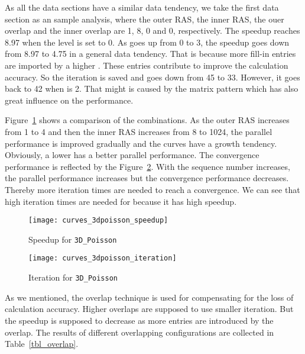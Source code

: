 \documentclass[runningheads,a4paper]{llncs}
\begin{document}
{As all the data sections have a similar data tendency, we take the first data section as an sample analysis, where the outer RAS, the inner RAS, the ouer overlap and the inner overlap are 1, 8, 0 and 0, respectively. The speedup reaches 8.97 when the  level is set to 0. As  goes up from 0 to 3, the speedup goes down from 8.97 to 4.75 in a general data tendency. That is because more fill-in entries are imported by a higher . These entries contribute to improve the calculation accuracy. So the iteration is saved and goes down from 45 to 33. However, it goes back to 42 when  is 2. That might is caused by the matrix pattern which has also great influence on the performance.

Figure~\ref{fig_3dpoisson_speedup} shows a comparison of the combinations. As the outer RAS increases from 1 to 4 and then the inner RAS increases from 8 to 1024, the parallel performance is improved gradually and the curves have a growth tendency. Obviously, a lower  has a better parallel performance. The convergence performance is reflected by the Figure~\ref{fig_3dpoisson_iteration}. With the sequence number increases, the parallel performance increases but the convergence performance decreases. Thereby more iteration times are needed to reach a convergence. We can see that high iteration times are needed for  because it has high speedup.

\begin{figure}[!tbh]
    \centering
    \texttt{[image: curves\_3dpoisson\_speedup]}
    \caption{Speedup for \texttt{3D\_Poisson}}
    \label{fig_3dpoisson_speedup}
\end{figure}

\begin{figure}[!tbh]
    \centering
    \texttt{[image: curves\_3dpoisson\_iteration]}
    \caption{Iteration for \texttt{3D\_Poisson}}
    \label{fig_3dpoisson_iteration}
\end{figure}

As we mentioned, the overlap technique is used for compensating for the loss of calculation accuracy. Higher overlaps are supposed to use smaller iteration. But the speedup is supposed to decrease as more entries are introduced by the overlap. The results of different overlapping configurations are collected in Table~\ref{tbl_overlap}.

}
\end{document}
